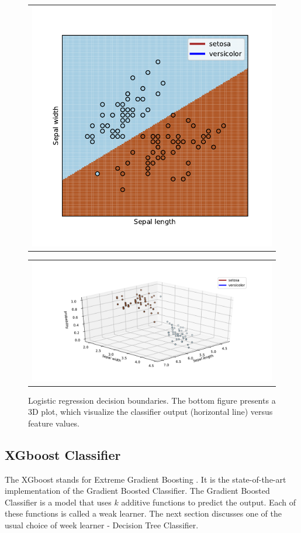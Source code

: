 \begin{figure}
  \centering
  \begin{tabular}{@{}c@{}}
    \includegraphics[width=0.6\linewidth]{figures/decision_boundaries_lr.pdf}
  \end{tabular}

  \vspace{\floatsep}

  \begin{tabular}{@{}c@{}}
    \includegraphics[width=\linewidth]{figures/3D_log_reg.pdf}
  \end{tabular}

  \caption{Logistic regression decision boundaries. The bottom figure presents a 3D plot, which visualize the classifier output (horizontal line) versus feature values.  
\label{fig:LRdecision boundary}}  
\end{figure}



\subsection{XGboost Classifier}
\label{sec:xgboost}
The XGboost stands for Extreme Gradient Boosting \cite{xgboost}. It is the state-of-the-art implementation of the Gradient Boosted Classifier. The Gradient Boosted Classifier is a model that uses $k$ additive functions to predict the output.  
Each of these functions is called a weak learner. The next section discusses one of the usual choice of week learner - Decision Tree Classifier. 


